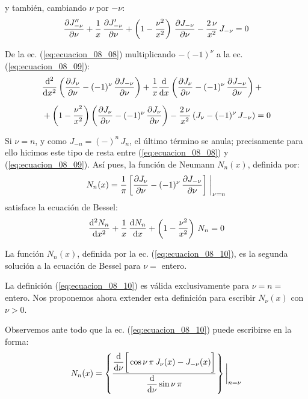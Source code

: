 y también, cambiando $\nu$ por $-\nu$:
\begin{align}
\pdv{\ensuremath{{J}^{\prime \prime}}_{-\nu}}{\nu} + \dfrac{1}{x} \, \pdv{\ensuremath{{J}^{\prime}}_{-\nu}}{\nu} + \left( 1 - \dfrac{\nu^{2}}{x^{2}} \right) \, \pdv{J_{-\nu}}{\nu} - \dfrac{2 \, \nu}{x^{2}} \, J_{-\nu} = 0
\label{eq:ecuacion_08_09} 
\end{align}

De la ec. (\ref{eq:ecuacion_08_08}) multiplicando $-(-1)^{\nu}$ a la ec. (\ref{eq:ecuacion_08_09}):
\begin{align*}
&\dv[2]{x} \left( \pdv{J_{\nu}}{\nu} - (-1)^{\nu} \, \pdv{J_{-\nu}}{\nu} \right) + \dfrac{1}{x} \dv{x} \left( \pdv{J_{\nu}}{\nu} - (-1)^{\nu} \,\pdv{J_{-\nu}}{\nu} \right) + \\[0.5em]
&+ \left( 1 - \dfrac{\nu^{2}}{x^{2}} \right) \left( \pdv{J_{\nu}}{\nu} - (-1)^{\nu}  \, \pdv{J_{\nu}}{\nu} \right) - \dfrac{2 \, \nu}{x^{2}} \, (J_{\nu} - (-1)^{\nu} \, J_{-\nu}) = 0
\end{align*}

Si $\nu = n$, y como $J_{-n} = (-)^{n} \, J_{n}$, el último término se anula; precisamente para ello hicimos este tipo de resta entre (\ref{eq:ecuacion_08_08}) y (\ref{eq:ecuacion_08_09}). Así pues, la función de Neumann $N_{n}(x)$, definida por:
\begin{align}
N_{n} (x) = \dfrac{1}{\pi} \left[ \pdv{J_{\nu}}{\nu} - (-1)^{\nu} \, \pdv{J_{-\nu}}{\nu} \right] \eval_{\nu=n}
\label{eq:ecuacion_08_10}
\end{align}
satisface la ecuación de Bessel:
\begin{align*}
\dv[2]{N_{n}}{x} + \dfrac{1}{x} \, \dv{N_{n}}{x} + \left( 1 - \dfrac{\nu^{2}}{x^{2}} \right) \, N_{n} = 0
\end{align*}

La función $N_{n}(x)$, definida por la ec. (\ref{eq:ecuacion_08_10}), es la segunda solución a la ecuación de Bessel para $\nu =$ entero.
\par
La definición (\ref{eq:ecuacion_08_10}) es válida exclusivamente para $\nu = n =$ entero. Nos proponemos ahora extender esta definición para escribir $N_{\nu} (x)$ con $\nu > 0$.
\par
Observemos ante todo que la ec. (\ref{eq:ecuacion_08_10}) puede escribirse en la forma:
\begin{align*}
N_{n} (x) =  \left\{ \dfrac{\displaystyle \dv{{\nu}} \bigg[ \cos \nu \, \pi \, J_{\nu} (x) - J_{-\nu} (x) \bigg]}{\displaystyle \dv{\nu} \sin \nu \, \pi} \right\}  \bigg\vert_{n=\nu}
\end{align*}

